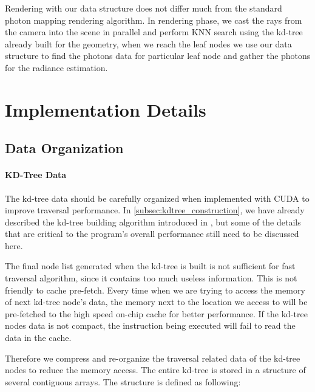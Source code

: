 Rendering with our data structure does not differ much from the standard photon mapping rendering algorithm. In rendering phase, we cast the rays from the camera into the scene in parallel and perform KNN search using the kd-tree already built for the geometry, when we reach the leaf nodes we use our data structure to find the photons data for particular leaf node and gather the photons for the radiance estimation.

\section{Implementation Details}
\label{sec:impl_detials}

\subsection{Data Organization}
\label{subsec:data_org}

\paragraph{KD-Tree Data}

The kd-tree data should be carefully organized when implemented with CUDA to improve traversal performance. In \ref{subsec:kdtree_construction}, we have already described the kd-tree building algorithm introduced in \cite{Zhou2008}, but some of the details that are critical to the program's overall performance still need to be discussed here.

The final node list generated when the kd-tree is built is not sufficient for fast traversal algorithm, since it contains too much useless information. This is not friendly to cache pre-fetch. Every time when we are trying to access the memory of next kd-tree node's data, the memory next to the location we access to will be pre-fetched to the high speed on-chip cache for better performance. If the kd-tree nodes data is not compact, the instruction being executed will fail to read the data in the cache. 


Therefore we compress and re-organize the traversal related data of the kd-tree nodes to reduce the memory access. The entire kd-tree is stored in a structure of several contiguous arrays. The structure is defined as following:



